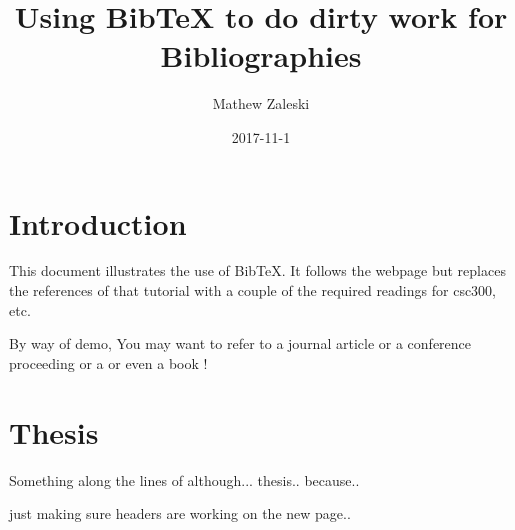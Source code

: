 \documentclass{article}
\begin{document}
\title{Using BibTeX to do dirty work for Bibliographies}
\author{Mathew Zaleski}
\date{2017-11-1}

\maketitle
\thispagestyle{fancy}
\section{Introduction}

This document illustrates the use of BibTeX\@.  It follows  the webpage
\cite{bibtex-tutorial}  but replaces the references of that tutorial
with a couple of the required readings for csc300, etc. 

By way of demo, You may want to refer to a journal article \cite{warren-brandeis-1890}
or a conference proceeding \cite{siva05} or a \cite{gosling-interview}
or even a book \cite {java-jvm-spec}!

\section{Thesis}

Something along the lines of although... thesis.. because..

\newpage

just making sure headers are working on the new page..




\end{document}

